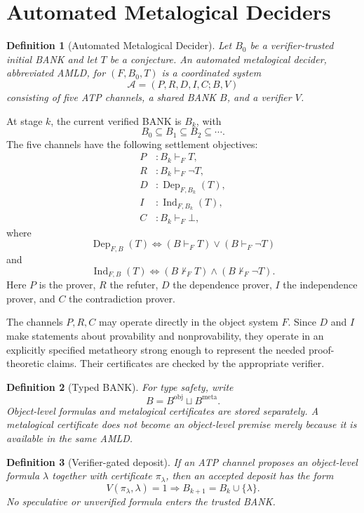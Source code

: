 \documentclass[11pt]{article}
\newtheorem{definition}{Definition}[section]
\theoremstyle{remark}
\newcommand{\Ind}{\operatorname{Ind}}
\newcommand{\Dep}{\operatorname{Dep}}
\begin{document}
\section{Automated Metalogical Deciders}
\begin{definition}[Automated Metalogical Decider]
Let $B_0$ be a verifier-trusted initial BANK and let $T$ be a conjecture. An automated metalogical decider, abbreviated AMLD, for $(F,B_0,T)$ is a coordinated system
\[
\mathcal A=(P,R,D,I,C;B,V)
\]
consisting of five ATP channels, a shared BANK $B$, and a verifier $V$.
\end{definition}
At stage $k$, the current verified BANK is $B_k$, with
\[
B_0\subseteq B_1\subseteq B_2\subseteq\cdots.
\]
The five channels have the following settlement objectives:
\begin{align*}
P &: B_k\vdash_F T,\\
R &: B_k\vdash_F\neg T,\\
D &: \Dep_{F,B_k}(T),\\
I &: \Ind_{F,B_k}(T),\\
C &: B_k\vdash_F\bot,
\end{align*}
where
\[
\Dep_{F,B}(T)\Longleftrightarrow(B\vdash_FT)\lor(B\vdash_F\neg T)
\]
and
\[
\Ind_{F,B}(T)\Longleftrightarrow(B\nvdash_FT)\land(B\nvdash_F\neg T).
\]
Here $P$ is the prover, $R$ the refuter, $D$ the dependence prover, $I$ the independence prover, and $C$ the contradiction prover.

The channels $P,R,C$ may operate directly in the object system $F$. Since $D$ and $I$ make statements about provability and nonprovability, they operate in an explicitly specified metatheory strong enough to represent the needed proof-theoretic claims. Their certificates are checked by the appropriate verifier.

\begin{definition}[Typed BANK]
For type safety, write
\[
B=B^{\mathrm{obj}}\sqcup B^{\mathrm{meta}}.
\]
Object-level formulas and metalogical certificates are stored separately. A metalogical certificate does not become an object-level premise merely because it is available in the same AMLD.
\end{definition}

\begin{definition}[Verifier-gated deposit]
If an ATP channel proposes an object-level formula $\lambda$ together with certificate $\pi_\lambda$, then an accepted deposit has the form
\[
V(\pi_\lambda,\lambda)=1\Longrightarrow B_{k+1}=B_k\cup\{\lambda\}.
\]
No speculative or unverified formula enters the trusted BANK.
\end{definition}
\end{document}
